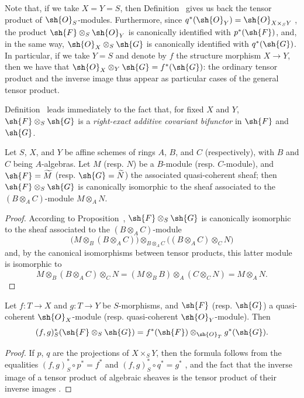 Note that, if we take $X=Y=S$, then Definition~ gives us back the tensor
product of $\sh{O}_S$-modules. Furthermore, since $q^*(\sh{O}_Y)=\sh{O}_{X\times_S Y}$
, the product $\sh{F}\otimes_S\sh{O}_Y$ is canonically
identified with $p^*(\sh{F})$, and, in the same way,
$\sh{O}_X\otimes_S\sh{G}$ is canonically identified with $q^*(\sh{G})$. In
particular, if we take $Y=S$ and denote by $f$ the structure morphism $X\to Y$,
then we have that $\sh{O}_X\otimes_Y\sh{G}=f^*(\sh{G})$: the ordinary tensor
product and the inverse image thus appear as particular cases of the general
tensor product.

Definition~ leads immediately to the fact that, for fixed $X$ and
$Y$, $\sh{F}\otimes_S\sh{G}$ is a \emph{right-exact additive covariant bifunctor} in $\sh{F}$ and $\sh{G}$.

\begin{proposition}[9.1.3]
\label{I.9.1.3}
Let $S$, $X$, and $Y$ be affine schemes of rings
$A$, $B$, and $C$ (respectively), with $B$ and $C$ being $A$-algebras. Let $M$
(resp. $N$) be a $B$-module (resp. $C$-module), and
$\sh{F}=\widetilde{M}$ (resp. $\sh{G}=\widetilde{N}$) the
associated quasi-coherent sheaf; then $\sh{F}\otimes_S\sh{G}$ is
canonically isomorphic to the sheaf associated to the $(B\otimes_A C)$-module
$M\otimes_A N$.
\end{proposition}

\begin{proof}
According to Proposition~, $\sh{F}\otimes_S\sh{G}$
is canonically isomorphic to the sheaf associated to the $(B\otimes_A C)$-module
\[
  \big(M\otimes_B(B\otimes_A C)\big)\otimes_{B\otimes_A C}\big((B\otimes_A C)\otimes_C N\big)
\]
and, by the canonical isomorphisms between tensor products, this latter module is isomorphic to
\[
  M\otimes_B(B\otimes_A C)\otimes_C N=(M\otimes_B B)\otimes_A(C\otimes_C N)=M\otimes_A N.
\]
\end{proof}

\begin{proposition}[9.1.4]
\label{I.9.1.4}
Let $f:T\to X$ and $g:T\to Y$ be $S$-morphisms, and $\sh{F}$ (resp. $\sh{G}$) a quasi-coherent $\sh{O}_X$-module (resp. quasi-coherent $\sh{O}_Y$-module).
Then
\[
  (f,g)^*_S(\sh{F}\otimes_S\sh{G})=f^*(\sh{F})\otimes_{\sh{O}_T}g^*(\sh{G}).
\]
\end{proposition}

\begin{proof}
If $p$, $q$ are the projections of $X\times_S Y$, then the formula follows
from the equalities $(f,g)^*_S\circ p^*=f^*$ and
$(f,g)^*_S\circ q^*=g^*$ , and the fact that the inverse
image of a tensor product of algebraic sheaves is the tensor product of their inverse
images .
\end{proof}

